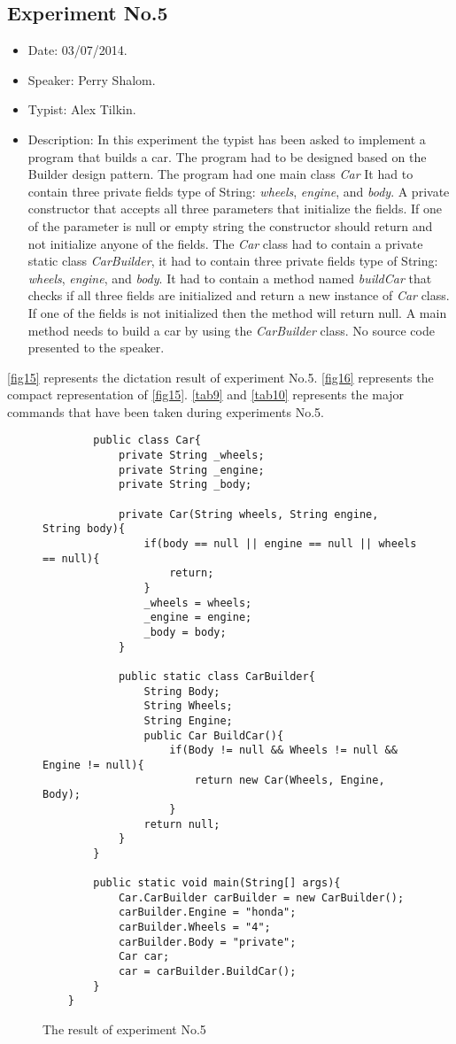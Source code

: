 \subsection{Experiment No.5}
\begin{itemize}
	\item Date: 03/07/2014.
	\item Speaker: Perry Shalom.
	\item Typist: Alex Tilkin.
	\item Description: In this experiment the typist has been asked to implement a program that builds a car. The program had to be designed based on the Builder design pattern. The program had one main class \textit{Car} It had to contain three private fields type of String: \textit{wheels}, \textit{engine}, and \textit{body}. A private constructor that accepts all three parameters that initialize the fields. If one of the parameter is null or empty string the constructor should return and not initialize anyone of the fields. The \textit{Car} class had to contain a private static class \textit{CarBuilder}, it had to contain three private fields type of String: \textit{wheels}, \textit{engine}, and \textit{body}. It had to contain a method named \textit{buildCar} that checks if all three fields are initialized and return a new instance of \textit{Car} class. If one of the fields is not initialized then the method will return null. A main method needs to build a car by using the \textit{CarBuilder} class. No source code presented to the speaker.
\end{itemize}
\autoref{fig15} represents the dictation result of experiment No.5. \autoref{fig16} represents the compact representation of \autoref{fig15}. \autoref{tab9} and \autoref{tab10} represents the major commands that have been taken during experiments No.5.
\begin{figure}[H]
	\begin{lstlisting}
		public class Car{
			private String _wheels;
			private String _engine;
			private String _body;
			
			private Car(String wheels, String engine, String body){
				if(body == null || engine == null || wheels == null){
					return;
				}
				_wheels = wheels;
				_engine = engine;
				_body = body;
			}
			
			public static class CarBuilder{
				String Body;
				String Wheels;
				String Engine;
				public Car BuildCar(){
					if(Body != null && Wheels != null && Engine != null){
						return new Car(Wheels, Engine, Body);
					}
				return null;
			}
		}
		
		public static void main(String[] args){
			Car.CarBuilder carBuilder = new CarBuilder();
			carBuilder.Engine = "honda";
			carBuilder.Wheels = "4";
			carBuilder.Body = "private";
			Car car;
			car = carBuilder.BuildCar();
		}
	}
	\end{lstlisting}
	\caption{The result of experiment No.5}
	\label{fig15}
\end{figure}
